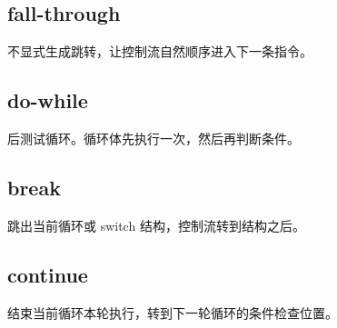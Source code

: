 \documentclass[UTF8,zihao=-4]{ctexart}
\begin{document}
\subsection*{fall-through}

不显式生成跳转，让控制流自然顺序进入下一条指令。

\subsection*{do-while}

后测试循环。循环体先执行一次，然后再判断条件。

\subsection*{break}

跳出当前循环或 switch 结构，控制流转到结构之后。

\subsection*{continue}

结束当前循环本轮执行，转到下一轮循环的条件检查位置。
\end{document}

